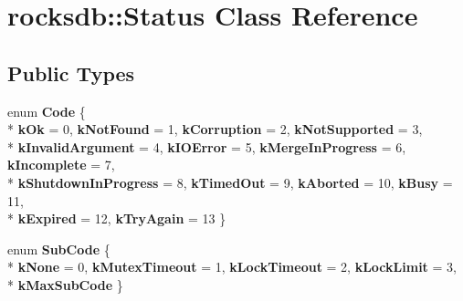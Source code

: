 \hypertarget{classrocksdb_1_1Status}{}\section{rocksdb\+:\+:Status Class Reference}
\label{classrocksdb_1_1Status}
\subsection*{Public Types}
\begin{DoxyCompactItemize}
\item 
enum {\bfseries Code} \{ \\*
{\bfseries k\+Ok} = 0, 
{\bfseries k\+Not\+Found} = 1, 
{\bfseries k\+Corruption} = 2, 
{\bfseries k\+Not\+Supported} = 3, 
\\*
{\bfseries k\+Invalid\+Argument} = 4, 
{\bfseries k\+I\+O\+Error} = 5, 
{\bfseries k\+Merge\+In\+Progress} = 6, 
{\bfseries k\+Incomplete} = 7, 
\\*
{\bfseries k\+Shutdown\+In\+Progress} = 8, 
{\bfseries k\+Timed\+Out} = 9, 
{\bfseries k\+Aborted} = 10, 
{\bfseries k\+Busy} = 11, 
\\*
{\bfseries k\+Expired} = 12, 
{\bfseries k\+Try\+Again} = 13
 \}\hypertarget{classrocksdb_1_1Status_a674f0382df1070a302a38eed9be0416d}{}\label{classrocksdb_1_1Status_a674f0382df1070a302a38eed9be0416d}

\item 
enum {\bfseries Sub\+Code} \{ \\*
{\bfseries k\+None} = 0, 
{\bfseries k\+Mutex\+Timeout} = 1, 
{\bfseries k\+Lock\+Timeout} = 2, 
{\bfseries k\+Lock\+Limit} = 3, 
\\*
{\bfseries k\+Max\+Sub\+Code}
 \}\hypertarget{classrocksdb_1_1Status_a5f057a64d03b29d53b2d97f4c10b520a}{}\label{classrocksdb_1_1Status_a5f057a64d03b29d53b2d97f4c10b520a}

\end{DoxyCompactItemize}
